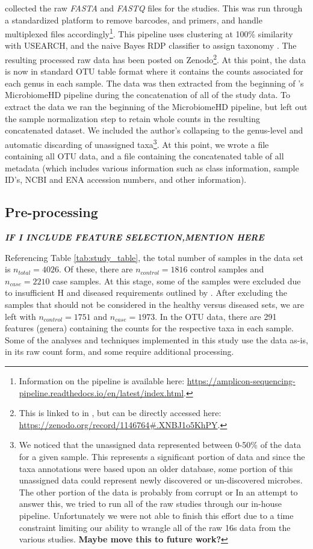 \citeauthor{Duvallet2017} collected the raw \textit{FASTA} and \textit{FASTQ} files for the studies. This was run through a standardized platform to remove barcodes, and primers, and handle multiplexed files accordingly\footnote{Information on the pipeline is available here: \url{https://amplicon-sequencing-pipeline.readthedocs.io/en/latest/index.html}.}. This pipeline uses clustering at 100\% similarity with USEARCH, and the naive Bayes RDP classifier to assign taxonomy \citep{Wang2007}. The resulting processed raw data has been posted on Zenodo\footnote{This is linked to in \cite{Duvallet2018}, but can be directly accessed here: \url{https://zenodo.org/record/1146764\#.XNBJ1o5KhPY}.}. At this point, the data is now in standard \acrshort{OTU} table format where it contains the counts associated for each genus in each sample. The data was then extracted from the beginning of \citeauthor{Duvallet2017}'s MicrobiomeHD pipeline during the concatenation of all of the study data. To extract the data we ran the beginning of the MicrobiomeHD pipeline, but left out the sample normalization step to retain whole counts in the resulting concatenated dataset. We included the author's collapsing to the genus-level and automatic discarding of unassigned taxa\footnote{We noticed that the unassigned data represented between 0-50\% of the data for a given sample. This represents a significant portion of data and since the taxa annotations were based upon an older database, some portion of this unassigned data could represent newly discovered or un-discovered microbes. The other portion of the data is probably from corrupt or  In an attempt to answer this, we tried to run all of the raw studies through our in-house pipeline. Unfortunately we were not able to finish this effort due to a time constraint limiting our ability to wrangle all of the raw 16s data from the various studies. \textbf{Maybe move this to future work?}}. At this point, we wrote a file containing all \acrshort{OTU} data, and a file containing the concatenated table of all metadata (which includes various information such as class information, sample ID's, \acrshort{NCBI} and \acrshort{ENA} accession numbers, and other information).

\subsection{Pre-processing}\label{sec:meth-processing}
\textbf{\textit{IF I INCLUDE FEATURE SELECTION,MENTION HERE}}

Referencing Table \ref{tab:study_table}, the total number of samples in the data set is  $n_{total}=4026$. Of these, there are $n_{control}=1816$ control samples and $n_{case}=2210$ case samples. At this stage, some of the samples were excluded due to insufficient \acrlong{H} and diseased requirements outlined by \citeauthor{Duvallet2017}. After excluding the samples that should not be considered in the healthy versus diseased sets, we are left with $n_{control}=1751$ and $n_{case}=1973$. In the \acrshort{OTU} data, there are 291 features (genera) containing the counts for the respective taxa in each sample. Some of the analyses and techniques implemented in this study use the data as-is, in its raw count form, and some require additional processing.

